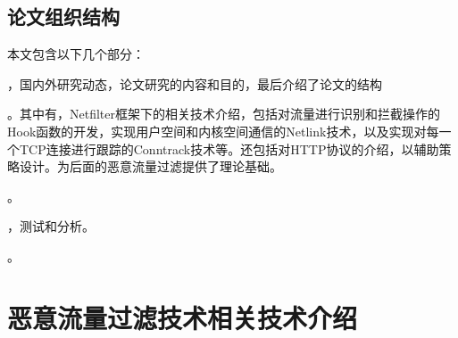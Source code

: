 \documentclass[a4paper,onecolumn,UTF8]{ctexart}
\begin{document}
\subsection{论文组织结构}
本文包含以下几个部分：
\par{}，国内外研究动态，论文研究的内容和目的，最后介绍了论文的结构
\par{}。其中有，Netfilter框架下的相关技术介绍，包括对流量进行识别和拦截操作的Hook函数的开发，实现用户空间和内核空间通信的Netlink技术，以及实现对每一个TCP连接进行跟踪的Conntrack技术等。还包括对HTTP协议的介绍，以辅助策略设计。为后面的恶意流量过滤提供了理论基础。
\par{}。
\par{}，测试和分析。
\par{}。
\section{恶意流量过滤技术相关技术介绍}
\end{document}
